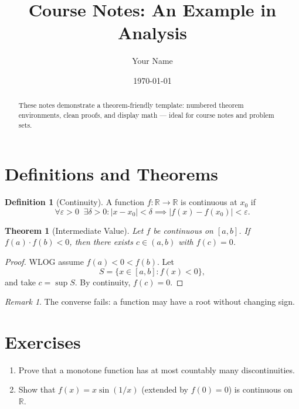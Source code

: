 \documentclass[11pt]{article}
\title{Course Notes: An Example in Analysis}
\author{Your Name}
\date{\today}
\newtheorem{theorem}{Theorem}
\theoremstyle{definition}
\newtheorem{definition}{Definition}
\theoremstyle{remark}
\newtheorem*{remark}{Remark}
\begin{document}
\maketitle

\begin{abstract}
These notes demonstrate a theorem-friendly template: numbered theorem
environments, clean proofs, and display math — ideal for course notes and
problem sets.
\end{abstract}

\section{Definitions and Theorems}

\begin{definition}[Continuity]
A function $f : \mathbb{R} \to \mathbb{R}$ is continuous at $x_0$ if
\[
\forall \varepsilon > 0 \;\; \exists \delta > 0 :
|x - x_0| < \delta \implies |f(x) - f(x_0)| < \varepsilon .
\]
\end{definition}

\begin{theorem}[Intermediate Value]
Let $f$ be continuous on $[a,b]$. If $f(a) \cdot f(b) < 0$, then there
exists $c \in (a,b)$ with $f(c) = 0$.
\end{theorem}

\begin{proof}
WLOG assume $f(a) < 0 < f(b)$. Let
\[
S = \{ x \in [a,b] : f(x) < 0 \},
\]
and take $c = \sup S$. By continuity, $f(c) = 0$.
\end{proof}

\begin{remark}
The converse fails: a function may have a root without changing sign.
\end{remark}

\section{Exercises}
\begin{enumerate}[label=\textbf{E\arabic*.}]
  \item Prove that a monotone function has at most countably many
        discontinuities.
  \item Show that $f(x) = x\sin(1/x)$ (extended by $f(0)=0$) is continuous
        on $\mathbb{R}$.
\end{enumerate}
\end{document}

